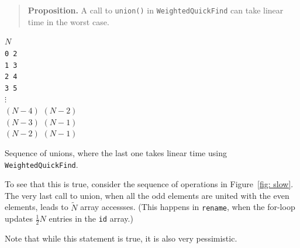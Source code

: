 \documentclass{tufte-handout}
\begin{document}
\begin{quote}
  {\bf Proposition.}
  A call to {\tt union()} in {\tt WeightedQuickFind} can take linear time in the worst case.
\end{quote}

\begin{marginfigure}
  \baselineskip
  \begin{tabbing}
    $N$\\
    {\tt 0 2}\\
    {\tt 1 3}\\
    {\tt 2 4}\\
    {\tt 3 5}\\
  $\vdots$\\
    $(N-4)$ $(N-2)$\\
    $(N-3)$ $(N-1)$\\
    $(N-2)$ $(N-1)$\\
  \end{tabbing}
\caption{\label{fig: slow}Sequence of unions, where the last one takes
  linear time using {\tt
    WeightedQuickFind}.}
\end{marginfigure}
To see that this is true, consider the sequence of operations in Figure~\ref{fig: slow}.
The very last call to union, when all the odd elements are united with the even elements, leads to $\tilde N$ array accessses.
(This happens in {\tt rename}, when the for-loop updates $\frac{1}{2}N$ entries in the {\tt id} array.)

Note that while this statement is true, it is also very pessimistic.
\end{document}
